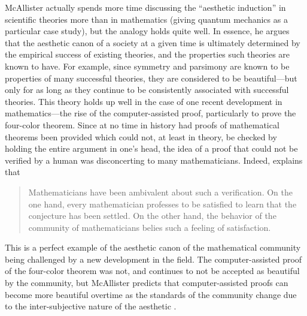 \documentclass[a4paper,man,natbib]{apa6}
\begin{document}
McAllister actually spends more time discussing the ``aesthetic induction'' in scientific theories more than
in mathematics (giving quantum mechanics as a particular case study), but the analogy holds quite well. In 
essence, he argues that the aesthetic canon of a society
at a given time is ultimately determined by the empirical success of existing theories, and the properties such
theories are known to have. For example, since symmetry and parsimony are known to be properties of many 
successful theories, they are considered to be beautiful---but only for as long as they continue to be consistently 
associated with successful theories. This theory holds up well in the case of one recent development in 
mathematics---the rise of the computer-assisted proof, particularly to prove the four-color theorem. Since at no
time in history had proofs of mathematical theorems been provided which could not, at least in theory, be checked 
by holding the entire argument in one's head, the idea of a proof that could not be verified by a human was
disconcerting to many mathematicians. Indeed, \cite{rota_phenomenology_1997} explains that
\begin{quotation}
      Mathematicians have been ambivalent about such a verification. On the one hand, every mathematician 
      professes to be satisfied to learn that the conjecture has been settled. On the other hand, the 
      behavior of the community of mathematicians belies such a feeling of satisfaction.
\end{quotation}
This is a perfect example of the aesthetic canon of the mathematical community being challenged by a new
development in the field. The computer-assisted proof of the four-color theorem was not, and continues to not be 
accepted as beautiful by the community, but McAllister predicts that computer-assisted proofs can become more 
beautiful overtime as the standards of the community change due to the inter-subjective nature of the 
aesthetic \cite{mcallister_mathematical_2005}.
\end{document}
